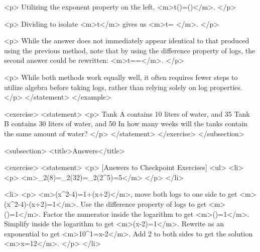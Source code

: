                 <p>
                    Utilizing the exponent property on the left, <m>t\log()=\log()</m>.
                </p>

                <p>
                    Dividing to isolate <m>t</m> gives us <m>t= </m>.
                </p>

                <p>
                    While the answer does not immediately appear identical to that produced using the previous method, note that by using the difference property of logs, the second answer could be rewritten: <m>t==</m>.
                </p>

                <p>
                    While both methods work equally well, it often requires fewer steps to utilize algebra before taking logs, rather than relying solely on log properties.
                </p>
            </statement>
        </example>

        <exercise>
            <statement>
                <p>
                    Tank A contains 10 liters of water, and 35%
                    Tank B contains 30 liters of water, and 50%
                    In how many weeks will the tanks contain the same amount of water?
                </p>
            </statement>
        </exercise>
    </subsection>


    <subsection>
        <title>Answers</title>

        <exercise>
            <statement>
                <p>
                    [Answers to Checkpoint Exercises]
                    <ul>
                        <li>
                            <p>
                                <m>\log_{2}(8)=\log_{2}(32)=\log_{2}(2^{5})=5</m>
                            </p>
                        </li>

                        <li>
                            <p>
                                <m>\log(x^{2}-4)=1+\log(x+2)</m>, move both logs to one side to get <m>\log(x^{2}-4)-\log(x+2)=1</m>. Use the difference property of logs to get <m>\log()=1</m>. Factor the numerator inside the logarithm to get <m>\log()=1</m>. Simplify inside the logarithm to get <m>\log(x-2)=1</m>. Rewrite as an exponential to get <m>10^{1}=x-2</m>. Add 2 to both sides to get the solution <m>x=12</m>.
                            </p>
                        </li>

